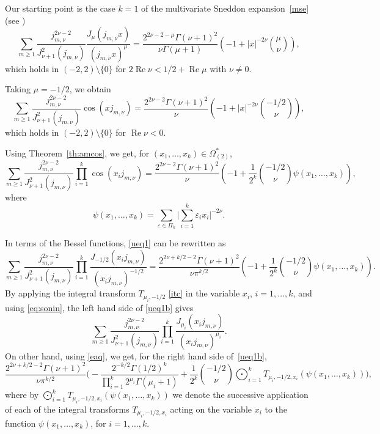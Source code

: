 \documentclass[12pt,leqno]{amsart}
\numberwithin{equation}{section}
\theoremstyle{plain}
\newcommand{\eps}{\varepsilon}
\renewcommand{\Re}{\operatorname{Re}}
\begin{document}
Our starting point is the case $k=1$ of the multivariate Sneddon expansion~\eqref{mse} (see \cite[Sect.~4.3]{DPVS})
\[
\sum_{m\ge 1}\frac{j_{m,\nu}^{2\nu-2}}{J^2_{\nu+1}(j_{m,\nu})}
\frac{J_{\mu}(j_{m,\nu}x)}{(j_{m,\nu}x)^{\mu}}
= \frac{2^{2\nu-2-\mu}\Gamma(\nu+1)^2}{\nu\Gamma(\mu+1)}
\left(-1+ |x|^{-2\nu} \binom{\mu}{\nu}\right),
\]
which holds in $(-2,2)\setminus\{0\}$ for $2\Re \nu<1/2+\Re \mu$ with $\nu\not=0$.

Taking $\mu=-1/2$, we obtain
\[
\sum_{m\ge 1}\frac{j_{m,\nu}^{2\nu-2}}{J^2_{\nu+1}(j_{m,\nu})}\cos (xj_{m,\nu})
= \frac{2^{2\nu-2}\Gamma(\nu+1)^2}{\nu}
\left(-1+ |x|^{-2\nu} \binom{-1/2}{\nu}\right),
\]
which holds in $(-2,2)\setminus\{0\}$ for $\Re \nu<0$.

Using Theorem~\ref{th:amcos}, we get, for $(x_1,\dots,x_k)\in \Omega_{(2)}^*$,
\begin{equation}
\label{ueq1}
\sum_{m\ge 1} \frac{j_{m,\nu}^{2\nu-2}}{J^2_{\nu+1}(j_{m,\nu})} \prod_{i=1}^k\cos (x_ij_{m,\nu})
= \frac{2^{2\nu-2}\Gamma(\nu+1)^2}{\nu}
\left(-1+\frac{1}{2^k} \binom{-1/2}{\nu}\psi(x_1,\dots,x_k)\right),
\end{equation}
where
\begin{equation}
\label{defp}
\psi(x_1,\dots,x_k)= \sum_{\eps \in \Pi_k} \Big|\sum_{i=1}^k\eps_ix_i\Big|^{-2\nu}.
\end{equation}

In terms of the Bessel functions, \eqref{ueq1} can be rewritten as
\begin{equation}
\label{ueq1b}
\sum_{m\ge 1} \frac{j_{m,\nu}^{2\nu-2}}{J^2_{\nu+1}(j_{m,\nu})}
\prod_{i=1}^k \frac{J_{-1/2}(x_ij_{m,\nu})}{(x_ij_{m,\nu})^{-1/2}}
= \frac{2^{2\nu+k/2-2}\Gamma(\nu+1)^2}{\nu \pi^{k/2}}
\left(-1+\frac{1}{2^k} \binom{-1/2}{\nu}\psi(x_1,\dots,x_k)\right).
\end{equation}
By applying the integral transform $T_{\mu_i,-1/2}$ \eqref{itc} in the variable $x_i$, $i=1,\dots, k$, and using \eqref{eq:sonin}, the left hand side of \eqref{ueq1b} gives
\[
\sum_{m\ge 1} \frac{j_{m,\nu}^{2\nu-2}}{J^2_{\nu+1}(j_{m,\nu})}
\prod_{i=1}^k \frac{J_{\mu_i}(x_ij_{m,\nu})}{(x_ij_{m,\nu})^{\mu_i}}.
\]
On other hand, using \eqref{eaq}, we get, for the right hand side of~\eqref{ueq1b},
\[
\frac{2^{2\nu+k/2-2} \Gamma(\nu+1)^2}{\nu \pi^{k/2}}
\Bigg({-}\frac{2^{-k/2}\Gamma(1/2)^{k}}{\prod_{i=1}^k2^{\mu_i}\Gamma(\mu_i+1)}
+ \frac{1}{2^k} \binom{-1/2}{\nu} \bigodot_{i=1}^k T_{\mu_i,-1/2,x_i}(\psi(x_1,\dots,x_k)) \Bigg),
\]
where by $\bigodot_{i=1}^k T_{\mu_i,-1/2,x_i}(\psi(x_1,\dots,x_k))$ we denote the successive application of each of the integral transforms $T_{\mu_i,-1/2,x_i}$ acting on the variable $x_i$ to the function $\psi(x_1,\dots,x_k)$, for $i=1,\dots, k$.
\end{document}

